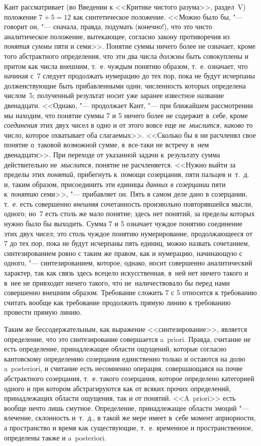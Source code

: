 Кант рассматривает (во Введении к <<Критике чистого разума>>, раздел~V)
положение $7+5=12$ как синтетическое положение. <<Можно было бы, "---
говорит он, "--- сначала, правда, подумать (конечно!), что это чисто
аналитическое положение, вытекающее, согласно закону противоречия из
{\em понятия суммы} пяти и семи>>. Понятие суммы ничего более не означает,
кроме того абстрактного определения, что эти два числа {\em должны} быть
совокуплены и притом как числа внешним, т.~е. чуждым понятию образом, т.~е.
означает, что начиная с~7 следует продолжать нумерацию до тех пор, пока не
будут исчерпаны долженствующие быть прибавленными одни, численность которых
определена числом~5; полученный результат носит уже заранее известное название
двенадцати. <<Однако, "--- продолжает Кант, "--- при ближайшем рассмотрении мы
находим, что понятие суммы 7 и 5 ничего более не содержит в~себе, кроме
{\em соединения} этих двух чисел в одно и от этого вовсе еще
не~{\em мыслится, каково} то число, которое охватывает оба слагаемых>>.
<<Сколько бы я ни расчленял свое понятие о~таковой возможной сумме,
я~все-таки не встречу в~нем двенадцати>>. При переходе от указанной задачи
к~результату сумма действительно не~{\em мыслится}, понятие не расчленяется.
<<Нужно выйти за пределы этих {\em понятий}, прибегнуть к~помощи
созерцания, пяти пальцев и~т.~д. и, таким образом, присоединить эти
единицы {\em данных в созерцании} пяти к~{\em понятию} семи>>, "--- прибавляет
он. Пять в самом деле дано в созерцании, т.~е. есть совершенно {\em внешняя}
сочетанность произвольно повторявшейся мысли, одного; но~7 есть столь же мало
понятие; здесь нет понятий, за пределы которых нужно было бы выходить. Сумма
7 и 5 означает чуждое понятию соединение этих двух чисел; это столь чуждое
понятию нумерирование, продолжающееся от 7 до тех пор, пока не будут исчерпаны
пять единиц, можно назвать сочетанием, синтезированием ровно с таким же правом,
как и нумерацию, начинающую с одного, "--- синтезированием, которое, однако,
носит совершенно аналитический характер, так как связь здесь всецело
искусственная, в~ней нет ничего такого и в~нее не привходит ничего такого,
чт\'{о} не~наличествовало бы перед нами совершенно внешним образом. Требование
сложить 7 с 5 относится к требованию считать вообще как требование продолжить
прямую линию к требованию провести прямую линию.

Таким же бессодержательным, как выражение <<синтезирование>>, является
определение, что это синтезирование совершается a~priori. Правда, считание не
есть определение, принадлежащее области ощущений, которые согласно кантовскому
определению созерцания единственно только и остаются на долю a~posteriori, и
считание есть несомненно операция, совершающаяся на почве абстрактного
созерцания, т.~е. такого созерцания, которое определено категорией одного и при
котором абстрагируются как от всяких прочих определений, принадлежащих области
ощущения, так и от понятий. <<A~priori>> есть вообще нечто лишь смутное.
Определение, принадлежащее области эмоций "--- влечение, склонность и~т.~д.,
в такой же мере имеет в~себе момент априорности, а пространство и время как
существующие, т.~е. временное и пространственное, определены также и
a~poste\-ri\-ori.

